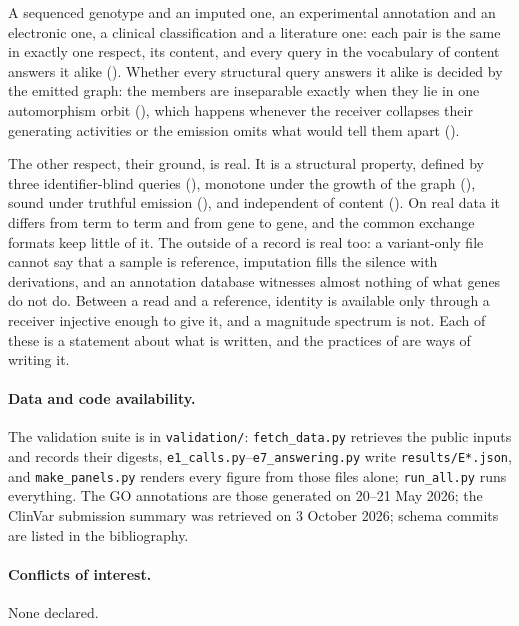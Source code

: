 \documentclass[11pt,twocolumn,a4paper]{article}
\theoremstyle{plain}
\theoremstyle{definition}
\theoremstyle{remark}
\begin{document}
A sequenced genotype and an imputed one, an experimental annotation and an
electronic one, a clinical classification and a literature one: each pair is
the same in exactly one respect, its content, and every query in the vocabulary
of content answers it alike (). Whether every structural
query answers it alike is decided by the emitted graph: the members are
inseparable exactly when they lie in one automorphism orbit (),
which happens whenever the receiver collapses their generating activities or
the emission omits what would tell them apart ().

The other respect, their ground, is real. It is a structural property, defined
by three identifier-blind queries (), monotone under the
growth of the graph (), sound under truthful emission
(), and independent of content (). On
real data it differs from term to term and from gene to gene, and the common
exchange formats keep little of it. The outside of a record is real too: a
variant-only file cannot say that a sample is reference, imputation fills the
silence with derivations, and an annotation database witnesses almost nothing
of what genes do not do. Between a read and a reference, identity is available
only through a receiver injective enough to give it, and a magnitude spectrum is
not. Each of these is a statement about what is written, and the practices of
 are ways of writing it.

\paragraph{Data and code availability.} The validation suite is in
\texttt{validation/}: \texttt{fetch\_data.py} retrieves the public inputs and
records their digests, \texttt{e1\_calls.py}--\texttt{e7\_answering.py} write
\texttt{results/E*.json}, and \texttt{make\_panels.py} renders every figure from
those files alone; \texttt{run\_all.py} runs everything. The GO annotations are
those generated on 20--21 May 2026; the ClinVar submission summary was retrieved
on 3 October 2026; schema commits are listed in the bibliography.

\paragraph{Conflicts of interest.} None declared.


\end{document}
